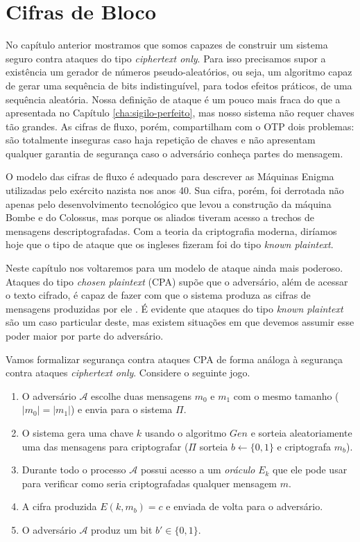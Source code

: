 \chapter{Cifras de Bloco}
\label{cha:cifras-de-bloco}

No capítulo anterior mostramos que somos capazes de construir um sistema seguro contra ataques do tipo {\em ciphertext only}.
Para isso precisamos supor a existência um gerador de números pseudo-aleatórios, ou seja, um algoritmo capaz de gerar uma sequência de bits indistinguível, para todos efeitos práticos, de uma sequência aleatória.
Nossa definição de ataque é um pouco mais fraca do que a apresentada no Capítulo \ref{cha:sigilo-perfeito}, mas nosso sistema não requer chaves tão grandes.
As cifras de fluxo, porém, compartilham com o OTP dois problemas: são totalmente inseguras caso haja repetição de chaves e não apresentam qualquer garantia de segurança caso o adversário conheça partes do mensagem.

O modelo das cifras de fluxo é adequado para descrever as Máquinas Enigma utilizadas pelo exército nazista nos anos 40.
Sua cifra, porém, foi derrotada não apenas pelo desenvolvimento tecnológico que levou a construção da máquina Bombe e do Colossus, mas porque os aliados tiveram acesso a trechos de mensagens descriptografadas.
Com a teoria da criptografia moderna, diríamos hoje que o tipo de ataque que os ingleses fizeram foi do tipo {\em known plaintext}.

Neste capítulo nos voltaremos para um modelo de ataque ainda mais poderoso.
Ataques do tipo {\em chosen plaintext} (CPA) supõe que o adversário, além de acessar o texto cifrado, é capaz de fazer com que o sistema produza as cifras de mensagens produzidas por ele \cite{Bellare97}.
É evidente que ataques do tipo {\em known plaintext} são um caso particular deste, mas existem situações em que devemos assumir esse poder maior por parte do adversário.

Vamos formalizar segurança contra ataques CPA de forma análoga à segurança contra ataques {\em ciphertext only}.
Considere o seguinte jogo.
\begin{enumerate}
\item O adversário $\mathcal{A}$ escolhe duas mensagens $m_0$ e $m_1$ com o mesmo tamanho ($|m_0| = |m_1|$) e envia para o sistema $\Pi$.
\item O sistema gera uma chave $k$ usando o algoritmo $Gen$ e sorteia aleatoriamente uma das mensagens para criptografar ($\Pi$ sorteia $b \leftarrow \{0, 1\}$ e criptografa $m_b$).
\item Durante todo o processo $\mathcal{A}$ possui acesso a um {\em oráculo} $E_k$ que ele pode usar para verificar como seria criptografadas qualquer mensagem $m$.
\item A cifra produzida $E(k, m_b) = c$ e enviada de volta para o adversário.
\item O adversário $\mathcal{A}$ produz um bit $b' \in \{0,1\}$.
\end{enumerate}

